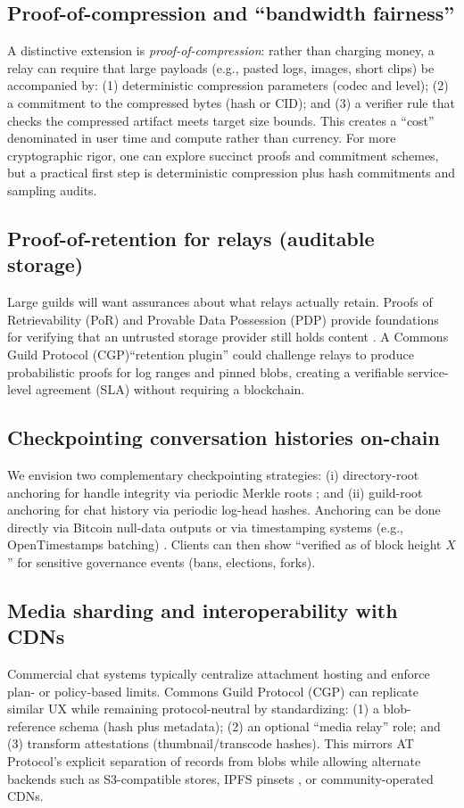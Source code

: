 \documentclass[conference]{IEEEtran}
\newcommand{\cgp}{Commons Guild Protocol (CGP)\xspace}
\newcommand{\atproto}{AT Protocol\xspace}
\begin{document}
\subsection{Proof-of-compression and ``bandwidth fairness''}
A distinctive extension is \emph{proof-of-compression}: rather than charging money, a relay can require that large payloads (e.g., pasted logs, images, short clips) be accompanied by: (1) deterministic compression parameters (codec and level); (2) a commitment to the compressed bytes (hash or CID); and (3) a verifier rule that checks the compressed artifact meets target size bounds. This creates a ``cost'' denominated in user time and compute rather than currency. For more cryptographic rigor, one can explore succinct proofs and commitment schemes, but a practical first step is deterministic compression plus hash commitments and sampling audits.

\subsection{Proof-of-retention for relays (auditable storage)}
Large guilds will want assurances about what relays actually retain. Proofs of Retrievability (PoR) and Provable Data Possession (PDP) provide foundations for verifying that an untrusted storage provider still holds content \cite{juels2007por,ateniese2007pdp}. A \cgp ``retention plugin'' could challenge relays to produce probabilistic proofs for log ranges and pinned blobs, creating a verifiable service-level agreement (SLA) without requiring a blockchain.

\subsection{Checkpointing conversation histories on-chain}
We envision two complementary checkpointing strategies: (i) directory-root anchoring for handle integrity via periodic Merkle roots \cite{rfc6962}; and (ii) guild-root anchoring for chat history via periodic log-head hashes. Anchoring can be done directly via Bitcoin null-data outputs \cite{bitcoinDevTx} or via timestamping systems (e.g., OpenTimestamps batching) \cite{opentimestamps,opentimestampsTodd}. Clients can then show ``verified as of block height $X$'' for sensitive governance events (bans, elections, forks).

\subsection{Media sharding and interoperability with CDNs}
Commercial chat systems typically centralize attachment hosting and enforce plan- or policy-based limits. \cgp can replicate similar UX while remaining protocol-neutral by standardizing: (1) a blob-reference schema (hash plus metadata); (2) an optional ``media relay'' role; and (3) transform attestations (thumbnail/transcode hashes). This mirrors \atproto's explicit separation of records from blobs \cite{atprotoBlobSpec,atprotoRepoSpec} while allowing alternate backends such as S3-compatible stores, IPFS pinsets \cite{ipfs}, or community-operated CDNs.
\end{document}
